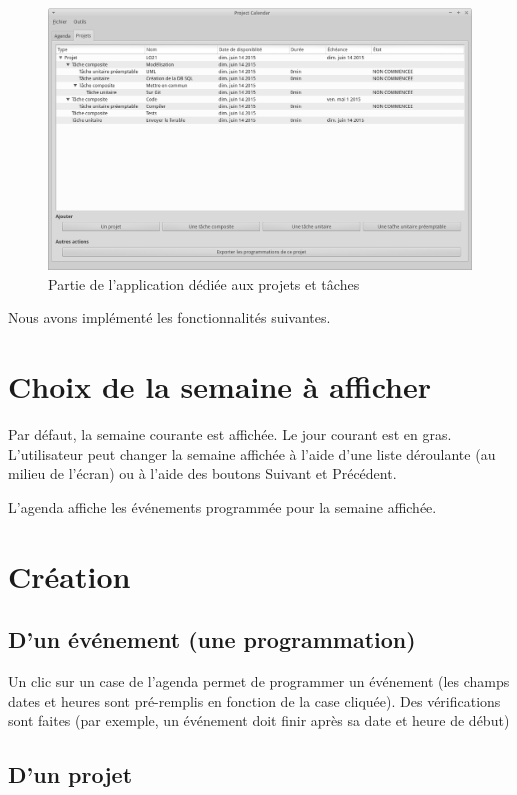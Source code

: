 \begin{figure}[h!]
  \centering
    \includegraphics[width=1.0\textwidth]{assets/screen_projets.png}
    \caption{Partie de l'application dédiée aux projets et tâches}
\end{figure}

Nous avons implémenté les fonctionnalités suivantes.

\section{Choix de la semaine à afficher}

Par défaut, la semaine courante est affichée. Le jour courant est en gras. L'utilisateur peut changer la semaine affichée à l'aide d'une liste déroulante (au milieu de l'écran) ou à l'aide des boutons \og Suivant\fg{} et \og Précédent\fg{}.

L'agenda affiche les événements programmée pour la semaine affichée.

\section{Création}
\subsection{D'un événement (une programmation)}

Un clic sur un case de l'agenda permet de programmer un événement (les champs dates et heures sont pré-remplis en fonction de la case cliquée). Des vérifications sont faites (par exemple, un événement doit finir après sa date et heure de début)

\subsection{D'un projet}


